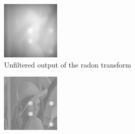 \begin{figure}
  \centering
  \hfill
  \begin{subfigure}[t]{0.3\textwidth}
    \includegraphics[width=\textwidth]{Chapters/flopt/Figs/PDF/results/no_helix/iradon_nofilter}
    \caption{Unfiltered output of the radon transform}
    \label{fig:iradon_nofilter}
  \end{subfigure}\hfill
  \begin{subfigure}[t]{0.3\textwidth}
    \includegraphics[width=\textwidth]{Chapters/flopt/Figs/PDF/results/no_helix/iradon_filter}

\end{subfigure}
\end{figure}
